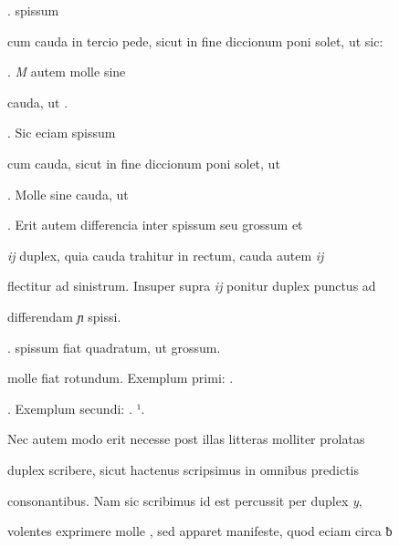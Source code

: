.  spissum

\fulllines
cum cauda in tercio pede, sicut in fine diccionum poni solet, ut sic:

     . \textit{M} autem molle sine

\splitlines
cauda, ut    .

. Sic eciam  spissum

\fulllines

cum cauda, sicut in fine diccionum poni solet, ut  

   . Molle sine cauda, ut 

 . Erit autem differencia inter  spissum seu grossum et

\textit{ij} duplex, quia cauda  trahitur in rectum, cauda autem \textit{ij}

flectitur ad sinistrum. Insuper supra \textit{ij} ponitur duplex punctus ad

\splitlines
differendam \textit{ɲ} spissi.

.  spissum fiat quadratum, ut  grossum.

\fulllines

 molle fiat rotundum. Exemplum primi:  .  


. Exemplum secundi:    .   ¹.

Nec autem modo erit necesse post illas litteras molliter prolatas

 duplex scribere, sicut hactenus scripsimus in omnibus predictis

consonantibus. Nam sic scribimus  id est percussit per duplex \textit{y},

volentes exprimere molle , sed apparet manifeste, quod eciam circa ƀ

